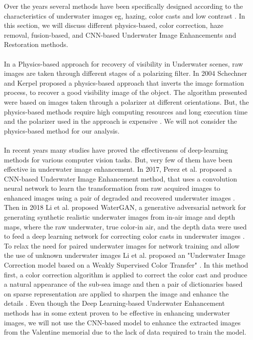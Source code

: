 \documentclass[a4paper,11pt,oneside]{article}
\begin{document}
  Over the years several methods have been specifically designed according to the characteristics of underwater images eg, hazing, color casts and low contrast \cite{15}. In this section, we will discuss different physics-based, color correction, haze removal, fusion-based, and CNN-based Underwater Image Enhancements and Restoration methods.\\
  \\
  In a Physics-based approach for recovery of visibility in Underwater scenes, raw images are taken through different stages of a polarizing filter. In 2004 Schechner and Kerpel \cite{19} proposed a physics-based approach that inverts the image formation process, to recover a good visibility image of the object. The algorithm presented were based on images taken through a polarizer at different orientations. But, the physics-based methods require high computing resources and long execution time and the polarizer used in the approach is expensive \cite{8}. We will not consider the physics-based method for our analysis.\\
  \\
  In recent years many studies have proved the effectiveness of deep-learning methods for various computer vision tasks. But, very few of them have been effective in underwater image enhancement. In 2017, Perez et al. \cite{22} proposed a CNN-based Underwater Image Enhancement method, that uses a convolution neural network to learn the transformation from raw acquired images to enhanced images using a pair of degraded and recovered underwater images \cite{15}. Then in 2018 Li et al. \cite{23} proposed WaterGAN, a generative adversarial network for generating synthetic realistic underwater images from in-air image and depth maps, where the raw underwater, true color-in air, and the depth data were used to feed a deep learning network for correcting color casts in underwater images \cite{15}. To relax the need for paired underwater images for network training and allow the use of unknown underwater images Li et al. \cite{7} proposed an "Underwater Image Correction model based on a Weakly Supervised Color Transfer" \cite{15}. In this method first, a color correction algorithm is applied to correct the color cast and produce a natural appearance of the sub-sea image and then a pair of dictionaries based on sparse representation are applied to sharpen the image and enhance the details \cite{7}. Even though the Deep Learning-based Underwater Enhancement methods has in some extent proven to be effective in enhancing underwater images, we will not use the CNN-based model to enhance the extracted images from the Valentine memorial due to the lack of data required to train the model.\\
\end{document}
